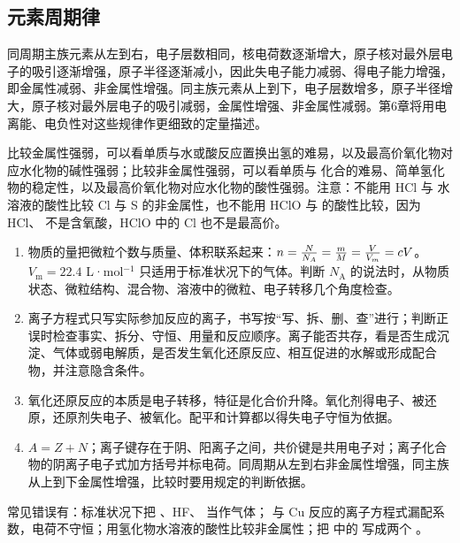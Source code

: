 \subsection{元素周期律}
同周期主族元素从左到右，电子层数相同，核电荷数逐渐增大，原子核对最外层电子的吸引逐渐增强，原子半径逐渐减小，因此失电子能力减弱、得电子能力增强，即金属性减弱、非金属性增强。同主族元素从上到下，电子层数增多，原子半径增大，原子核对最外层电子的吸引减弱，金属性增强、非金属性减弱。第6章将用电离能、电负性对这些规律作更细致的定量描述。

比较金属性强弱，可以看单质与水或酸反应置换出氢的难易，以及最高价氧化物对应水化物的碱性强弱；比较非金属性强弱，可以看单质与  化合的难易、简单氢化物的稳定性，以及最高价氧化物对应水化物的酸性强弱。注意：不能用 HCl 与  水溶液的酸性比较 Cl 与 S 的非金属性，也不能用 HClO 与  的酸性比较，因为 HCl、 不是含氧酸，HClO 中的 Cl 也不是最高价。



\begin{enumerate}
\item 物质的量把微粒个数与质量、体积联系起来：$n=\frac N{N_\text A}=\frac mM=\frac V{V_\text m}=cV$。$V_\text{m}=22.4$ L·mol$^{-1}$ 只适用于标准状况下的气体。判断 $N_\text{A}$ 的说法时，从物质状态、微粒结构、混合物、溶液中的微粒、电子转移几个角度检查。
\item 离子方程式只写实际参加反应的离子，书写按“写、拆、删、查”进行；判断正误时检查事实、拆分、守恒、用量和反应顺序。离子能否共存，看是否生成沉淀、气体或弱电解质，是否发生氧化还原反应、相互促进的水解或形成配合物，并注意隐含条件。
\item 氧化还原反应的本质是电子转移，特征是化合价升降。氧化剂得电子、被还原，还原剂失电子、被氧化。配平和计算都以得失电子守恒为依据。
\item $A=Z+N$；离子键存在于阴、阳离子之间，共价键是共用电子对；离子化合物的阴离子电子式加方括号并标电荷。同周期从左到右非金属性增强，同主族从上到下金属性增强，比较时要用规定的判断依据。
\end{enumerate}
常见错误有：标准状况下把 、HF、 当作气体； 与 Cu 反应的离子方程式漏配系数，电荷不守恒；用氢化物水溶液的酸性比较非金属性；把  中的  写成两个 。

